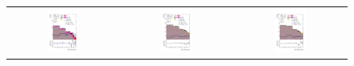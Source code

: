 \documentclass[PAPER, coverpage, atlasdraft=true, texlive=2016, UKenglish]{\ATLASLATEXPATH atlasdoc}
\providecommand{\DIFaddbeginFL}{} %
\providecommand{\DIFaddendFL}{} %
\providecommand{\DIFdelbeginFL}{} %
\providecommand{\DIFdelendFL}{} %
\begin{document}
\begin{figure}[H]
\begin{tabular}{@{}ccc@{}}
\DIFdelbeginFL %
\DIFdelendFL \DIFaddbeginFL \includegraphics[width=0.3\textwidth]{figures/tuH_reg1l2tau1bnj_os.pdf}\DIFaddendFL &
\DIFdelbeginFL %
\DIFdelendFL \DIFaddbeginFL \includegraphics[width=0.3\textwidth]{figures/tuH_reg1l1tau1b1j_ss.pdf}\DIFaddendFL &
\DIFdelbeginFL %
\DIFdelendFL \DIFaddbeginFL \includegraphics[width=0.3\textwidth]{figures/tuH_reg1l1tau1b2j_ss.pdf}\DIFaddendFL \\

\end{tabular}
\end{figure}
\end{document}
